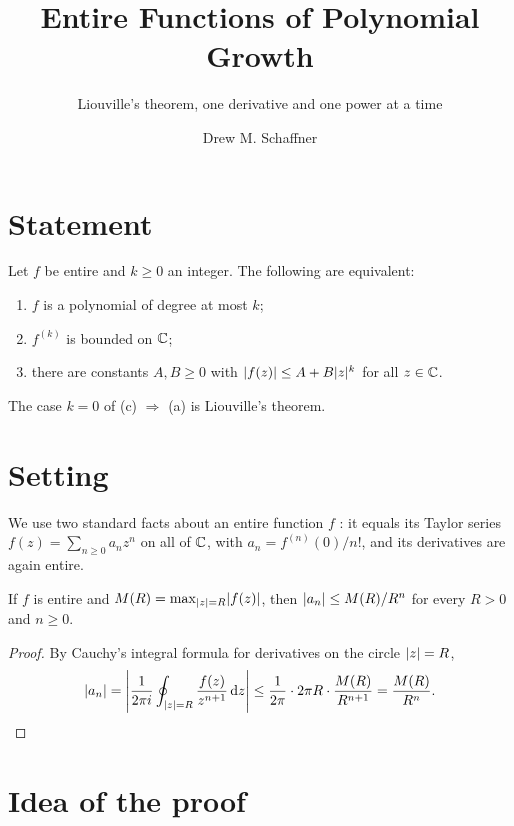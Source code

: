 \documentclass[11pt,a4paper]{article}
\title{Entire Functions of Polynomial Growth}
\subtitle{Liouville's theorem, one derivative and one power at a time}
\author{Drew M. Schaffner}
\begin{document}
\maketitle

\section{Statement}

\begin{theorem}\label{thm:main}
  Let $f$ be entire and $k \geq 0$ an integer. The following are equivalent:
  \begin{enumerate}[label=(\alph*)]
    \item $f$ is a polynomial of degree at most $k$;
    \item $f^{(k)}$ is bounded on $\C$;
    \item there are constants $A, B \geq 0$ with $\abs{f(z)} \leq A + B \abs{z}^k$
      for all $z \in \C$.
  \end{enumerate}
\end{theorem}

The case $k = 0$ of (c) $\Rightarrow$ (a) is Liouville's theorem.

\section{Setting}

We use two standard facts about an entire function $f$ \cite[ch.~4--5]{saff-snider}:
it equals its Taylor series $f(z) = \sum_{n \geq 0} a_n z^n$ on all of $\C$, with
$a_n = f^{(n)}(0)/n!$, and its derivatives are again entire.

\begin{lemma}\label{lem:cauchy}
  If $f$ is entire and $M(R) = \max_{\abs{z} = R} \abs{f(z)}$, then
  $\abs{a_n} \leq M(R) / R^n$ for every $R > 0$ and $n \geq 0$.
\end{lemma}

\begin{proof}
  By Cauchy's integral formula for derivatives on the circle $\abs{z} = R$,
  \[
    \abs{a_n} = \abs*{\frac{1}{2\pi i} \oint_{\abs{z} = R} \frac{f(z)}{z^{n+1}} \dd z}
    \leq \frac{1}{2\pi} \cdot 2\pi R \cdot \frac{M(R)}{R^{n+1}}
    = \frac{M(R)}{R^n}. \qedhere
  \]
\end{proof}

\section{Idea of the proof}
\end{document}
